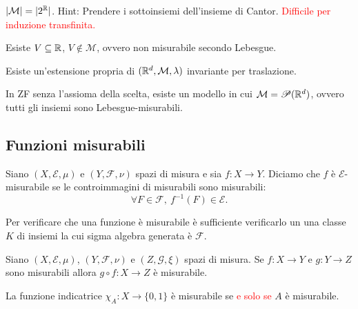 \begin{exercise}
	$\left|\mathcal{M}\right|=|2^{\mathbb{R}}|$.
	Hint: Prendere i sottoinsiemi dell'insieme di Cantor. \textcolor{red}{Difficile per induzione transfinita.}
\end{exercise}

\begin{exercise}
	Esiste $V\subseteq \mathbb{R}$, $V\not\in \mathcal{M}$, ovvero non misurabile secondo Lebesgue.
\end{exercise}

\begin{exercise}
	Esiste un'estensione propria di $(\mathbb{R}^d, \mathcal{M}, \lambda)$ invariante per traslazione.
\end{exercise}

\begin{exercise}
	In ZF senza l'assioma della scelta, esiste un modello in cui $\mathcal{M}=\mathscr{P}(\mathbb{R}^d)$, ovvero tutti gli insiemi sono Lebesgue-misurabili.
\end{exercise}

\subsection{Funzioni misurabili}
\begin{definition}
	Siano $ (X,\mathcal{E},\mu) $ e $ (Y,\mathcal{F},\nu) $ spazi di misura e sia \linebreak$ f\colon X\to Y $. Diciamo che $ f $ è $ \mathcal{E} $-misurabile se le controimmagini di misurabili sono misurabili:
	\[ 
        \forall F \in \mathcal{F}, \ f^{-1}(F) \in \mathcal{E}.
    \]
\end{definition}

\begin{oss}
    Per verificare che una funzione è misurabile è sufficiente verificarlo un una classe $ K $ di insiemi la cui sigma algebra generata è $ \mathcal{F} $.
\end{oss}

\begin{proposition}
    Siano $ (X,\mathcal{E},\mu) $, $ (Y,\mathcal{F},\nu) $ e $ (Z, \mathcal{G}, \xi) $ spazi di misura. Se $ f \colon X \to Y $ e $ g \colon Y \to Z $ sono misurabili allora $ g \circ f \colon X \to Z $ è misurabile.
\end{proposition}

\begin{exercise}
	La funzione indicatrice $ \chi_A \colon X \to \{0,1\} $ è misurabile se \textcolor{red}{e solo se} $ A $ è misurabile.
\end{exercise}

